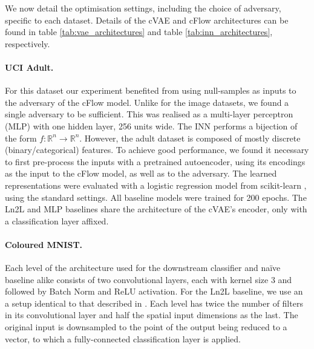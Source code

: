 We now detail the optimisation settings, including the choice of adversary, specific to each dataset. Details of the cVAE and cFlow architectures can be found in table \ref{tab:vae_architectures} and table \ref{tab:inn_architectures}, respectively.

\paragraph{UCI Adult.} 
For this dataset our experiment benefited from using null-samples as inputs to the adversary of the cFlow model. Unlike for the image datasets, we found a single adversary to be sufficient. This was realised as a multi-layer perceptron (MLP) with one hidden layer, 256 units wide. The INN performs a bijection of the form $f: \mathbb{R}^n \rightarrow \mathbb{R}^n$. However, the adult dataset is composed of mostly discrete (binary/categorical) features. To achieve good performance, we found it necessary to first pre-process the inputs with a pretrained autoencoder, using its encodings as the input to the cFlow model, as well as to the adversary. The learned representations were evaluated with a logistic regression model from scikit-learn \citep{scikit-learn}, using the standard settings. All baseline models were trained for 200 epochs.
The Ln2L \citep{kim2019learning} and MLP baselines share the architecture of the cVAE's encoder, only with a classification layer affixed.

\paragraph{Coloured MNIST.}
Each level of the architecture used for the downstream classifier and na\"ive baseline alike consists of two convolutional layers, each with kernel size 3 and followed by Batch Norm \citep{ioffe2015batch} and ReLU activation. For the Ln2L baseline, we use an a setup identical to that described in \citet{kim2019learning}. Each level has twice the number of filters in its convolutional layer and half the spatial input dimensions as the last. The original input is downsampled to the point of the output being reduced to a vector, to which a fully-connected classification layer is applied.

